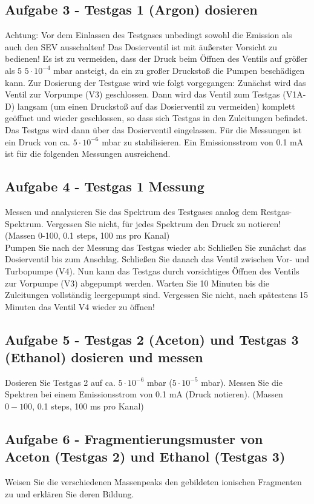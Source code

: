 \subsection*{Aufgabe 3 - Testgas 1 (Argon) dosieren}
Achtung: Vor dem Einlassen des Testgases unbedingt sowohl die Emission als auch den SEV ausschalten! Das Dosierventil ist mit äußerster Vorsicht zu bedienen! Es ist zu vermeiden, dass der Druck beim Öffnen des Ventils auf größer als 5 $5 \cdot 10^{-4}$ mbar ansteigt, da ein zu großer Druckstoß die Pumpen beschädigen kann. Zur Dosierung der Testgase wird wie folgt vorgegangen: Zunächst wird das Ventil zur Vorpumpe (V3) geschlossen. Dann wird das Ventil zum Testgas (V1A-D) langsam (um einen Druckstoß auf das Dosierventil zu vermeiden) komplett geöffnet und wieder geschlossen, so dass sich Testgas in den Zuleitungen befindet. Das Testgas wird dann über das Dosierventil eingelassen. Für die Messungen ist ein Druck von ca. $5 \cdot 10^{-6}$ mbar zu stabilisieren. Ein Emissionsstrom von 0.1 mA ist für die folgenden Messungen ausreichend. 

\subsection*{Aufgabe 4 - Testgas 1 Messung}
Messen und analysieren Sie das Spektrum des Testgases analog dem Restgas-Spektrum. Vergessen Sie nicht, für jedes Spektrum den Druck zu notieren! (Massen 0-100, 0.1 steps, 100 ms pro Kanal)\\
Pumpen Sie nach der Messung das Testgas wieder ab: Schließen Sie zunächst das Dosierventil bis zum Anschlag. Schließen Sie danach das Ventil zwischen Vor- und Turbopumpe (V4). Nun kann das Testgas durch vorsichtiges Öffnen des Ventils zur Vorpumpe (V3) abgepumpt werden. Warten Sie 10 Minuten bis die Zuleitungen vollständig leergepumpt sind. Vergessen Sie nicht, nach spätestens 15 Minuten das Ventil V4 wieder zu öffnen! 

\subsection*{Aufgabe 5 - Testgas 2 (Aceton) und Testgas 3 (Ethanol) dosieren und messen}
Dosieren Sie Testgas 2 auf ca. $5 \cdot 10^{-6}$ mbar ($5 \cdot 10^{-5}$ mbar). Messen Sie die Spektren bei einem Emissionsstrom von 0.1 mA (Druck notieren). (Massen $0-100$, 0.1 steps, 100 ms pro Kanal) 

\subsection*{Aufgabe 6 - Fragmentierungsmuster von Aceton (Testgas 2) und Ethanol (Testgas 3)}
Weisen Sie die verschiedenen Massenpeaks den gebildeten ionischen Fragmenten zu und erklären Sie deren Bildung.

